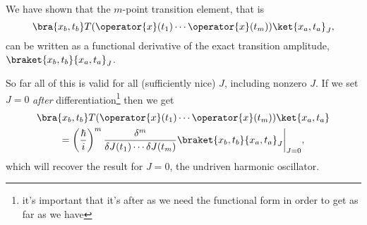 \documentclass[fleqn]{NotesClass}
\newcommand*{\timeorder}{T}
\begin{document}
    We have shown that the \(m\)-point transition element, that is
    \begin{equation}
        \bra{x_b, t_b} \timeorder(\operator{x}(t_1) \dotsm \operator{x}(t_m)) \ket{x_a, t_a}_J,
    \end{equation}
    can be written as a functional derivative of the exact transition amplitude, \(\braket{x_b, t_b}{x_a, t_a}_J\).

    So far all of this is valid for all (sufficiently nice) \(J\), including nonzero \(J\).
    If we set \(J = 0\) \emph{after} differentiation\footnote{it's important that it's after as we need the functional form in order to get as far as we have} then we get
    \begin{multline}
        \bra{x_b, t_b} \timeorder(\operator{x}(t_1) \dotsm \operator{x}(t_m)) \ket{x_a, t_a}\\
        = \left( \frac{\hbar}{i} \right)^m \frac{\delta^m}{\delta J(t_1) \dotsm \delta J(t_m)}\braket{x_b, t_b}{x_a, t_a}_J \bigg\vert_{J = 0},\label{eqn:m-point correlation}
    \end{multline}
    which will recover the result for \(J = 0\), the undriven harmonic oscillator.
    
\end{document}
